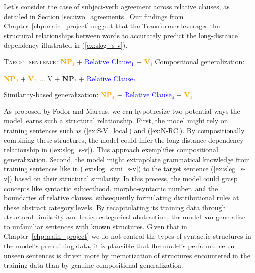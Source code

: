 Let's consider the case of subject-verb agreement across relative clauses, as detailed in Section \ref{sec:two_agreements}. Our findings from Chapter~\ref{chp:main_project} suggest that the Transformer leverages the structural relationships between words to accurately predict the long-distance dependency illustrated in (\ref{ex:slog_s-v}).
\vspace{-0.25\baselineskip}
\begin{exe}
    \ex \label{ex:slog_s-v} \textsc{Target sentence:} \textcolor{orange}{\textbf{NP$_1$}} + \textcolor{blue}{Relative Clause$_1$} + \textcolor{orange}{\textbf{V$_1$}}
    \ex Compositional generalization:
    \begin{xlist}
        \ex \label{ex:S-V_local} \textcolor{orange}{\textbf{NP$_2$}} + \textcolor{orange}{\textbf{V}$_2$}
        \ex \label{ex:N-RC} ... V + \textbf{NP}$_3$ + \textcolor{blue}{Relative Clause$_3$}.
    \end{xlist}
    \ex \label{ex:slog_simi_s-v}Similarity-based generalization:  \textcolor{orange}{\textbf{NP$_4$}} + \textcolor{blue}{Relative Clause$_4$} + \textcolor{orange}{\textbf{V$_4$}}
\end{exe}
\vspace{-0.25\baselineskip}
As proposed by Fodor and Marcus, we can hypothesize two potential ways the model learns such a structural relationship. First, the model might rely on training sentences such as (\ref{ex:S-V_local}) and (\ref{ex:N-RC}). By compositionally combining these structures, the model could infer the long-distance dependency relationship in (\ref{ex:slog_s-v}). This approach exemplifies compositional generalization. Second, the model might extrapolate grammatical knowledge from training sentences like in (\ref{ex:slog_simi_s-v}) to the target sentence (\ref{ex:slog_s-v}) based on their structural similarity. In this process, the model could grasp concepts like syntactic subjecthood, morpho-syntactic number, and the boundaries of relative clauses, subsequently formulating distributional rules at these abstract category levels. By recapitulating its training data through structural similarity and lexico-categorical abstraction, the model can generalize to unfamiliar sentences with known structures. Given that in Chapter~\ref{chp:main_project} we do not control the types of syntactic structures in the model's pretraining data, it is plausible that the model's performance on unseen sentences is driven more by memorization of structures encountered in the training data than by genuine compositional generalization.


